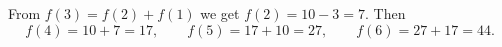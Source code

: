 From $f(3)=f(2)+f(1)$ we get $f(2)=10-3=7$. Then
\[f(4)=10+7=17,\qquad f(5)=17+10=27,\qquad f(6)=27+17=\boxed{44}.\]
